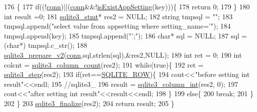 \begin{DoxyCode}
176                                                \{
177                 \textcolor{keywordflow}{if}((!\hyperlink{class_tetris_1_1_d_b_management_1_1_d_b_manager_acc2c19420c2b1b1b2c1e724b3a8ec4b7}{conn})||(\hyperlink{class_tetris_1_1_d_b_management_1_1_d_b_manager_acc2c19420c2b1b1b2c1e724b3a8ec4b7}{conn}&&!\hyperlink{class_tetris_1_1_d_b_management_1_1_d_b_manager_aa80722572c33389c1c73f88de9f199b6}{isExistAppSetting}(key)))\{
178                     \textcolor{keywordflow}{return} 0;
179                 \}
180                 \textcolor{keywordtype}{int} result =0;
181                 \hyperlink{sqlite3_8h_af2a033da1327cdd77f0a174a09aedd0c}{sqlite3\_stmt}* res2 = NULL;
182                 \textcolor{keywordtype}{string} tmpsql = \textcolor{stringliteral}{""};
183                 tmpsql.append(\textcolor{stringliteral}{"select value from appsetting where setting\_name='"});
184                 tmpsql.append(key);
185                 tmpsql.append(\textcolor{stringliteral}{"';"});
186                 \textcolor{keywordtype}{char}* sql = NULL;
187                 sql =(\textcolor{keywordtype}{char}*) tmpsql.c\_str();
188                 \hyperlink{sqlite3_8h_a85d4203bb54c984c5325c2f5b3664985}{sqlite3\_prepare\_v2}(\hyperlink{class_tetris_1_1_d_b_management_1_1_d_b_manager_acc2c19420c2b1b1b2c1e724b3a8ec4b7}{conn},sql,strlen(sql),&res2,NULL);
189                 \textcolor{keywordtype}{int} ret = 0;
190                 \textcolor{keywordtype}{int} colcnt = \hyperlink{sqlite3_8h_a326cbde878820fd108f5961d5318f585}{sqlite3\_column\_count}(res2);
191                 \textcolor{keywordflow}{while}(\textcolor{keyword}{true})\{
192                     ret = \hyperlink{sqlite3_8h_ac1e491ce36b7471eb28387f7d3c74334}{sqlite3\_step}(res2);
193                     \textcolor{keywordflow}{if}(ret==\hyperlink{sqlite3_8h_a624365823d0b11a99ccb49e9bb5f8fcf}{SQLITE\_ROW})\{
194                         cout<<\textcolor{stringliteral}{"before setting int result"}<<endl;
195                         \textcolor{comment}{//sqlite3\_}
196                         result = \hyperlink{sqlite3_8h_a6bd16f5b3266f473e37e8e3d4ebb4290}{sqlite3\_column\_int}(res2, 0);
197                         cout<<\textcolor{stringliteral}{"after setting int result"}<<result<<endl;
198                     \}
199                     \textcolor{keywordflow}{else}\{
200                         \textcolor{keywordflow}{break};
201                     \}
202                 \}
203                 \hyperlink{sqlite3_8h_a801195c0f771d40bb4be1e40f3b88945}{sqlite3\_finalize}(res2);
204                 \textcolor{keywordflow}{return} result;
205             \}
\end{DoxyCode}
